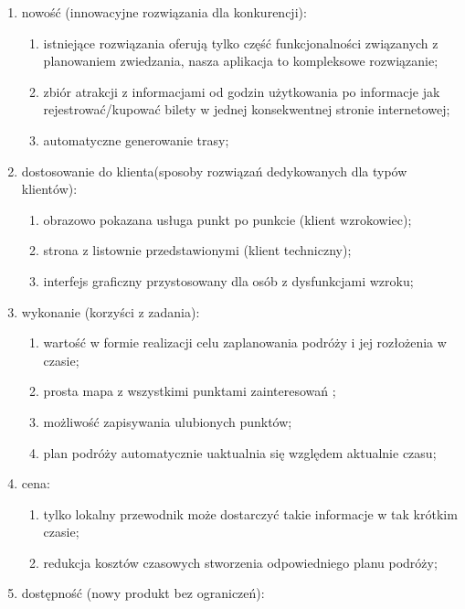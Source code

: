 \begin{enumerate}[label=\Roman*.]
\begin{enumerate}[label=\alph*.]
        \item nowość (innowacyjne rozwiązania dla konkurencji):
        \begin{enumerate}[label=\roman*.]
            \item istniejące rozwiązania oferują tylko część funkcjonalności związanych z planowaniem zwiedzania, nasza aplikacja to kompleksowe rozwiązanie;
            \item zbiór atrakcji z informacjami od godzin użytkowania po informacje jak rejestrować/kupować bilety w jednej konsekwentnej stronie internetowej;
            \item automatyczne generowanie trasy;
        \end{enumerate}
        \item dostosowanie do klienta(sposoby rozwiązań dedykowanych dla typów klientów):
        \begin{enumerate}[label=\roman*.]
            \item obrazowo pokazana usługa punkt po punkcie (klient wzrokowiec);
            \item strona z listownie przedstawionymi  (klient techniczny);
            \item interfejs graficzny przystosowany dla osób z dysfunkcjami wzroku;
        \end{enumerate}
        \item wykonanie (korzyści z zadania):
        \begin{enumerate}[label=\roman*.]
            \item wartość w formie realizacji celu zaplanowania podróży i jej rozłożenia w czasie;
            \item prosta mapa z wszystkimi punktami zainteresowań ;
            \item możliwość zapisywania ulubionych punktów;
            \item plan podróży automatycznie uaktualnia się względem aktualnie  czasu;
        \end{enumerate}
        \item cena:
        \begin{enumerate}[label=\roman*.]
            \item tylko lokalny przewodnik może dostarczyć takie informacje w tak krótkim czasie;
            \item redukcja kosztów czasowych stworzenia odpowiedniego planu podróży;
        \end{enumerate}
        \item dostępność (nowy produkt bez ograniczeń):

\end{enumerate}
\end{enumerate}

